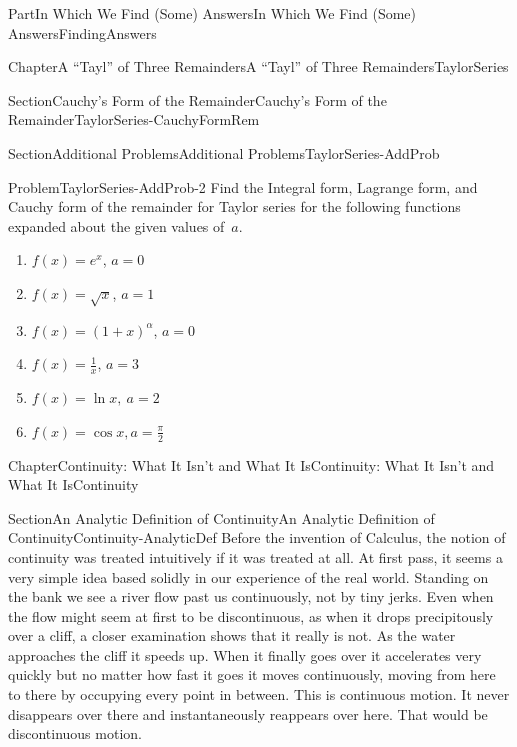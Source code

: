 \documentclass[oneside,10pt,]{book}
\numberwithin{equation}{part}
\begin{document}
\begin{partptx}{Part}{In Which We Find (Some) Answers}{}{In Which We Find (Some) Answers}{}{}{FindingAnswers}
\begin{chapterptx}{Chapter}{A ``Tayl'' of Three Remainders}{}{A ``Tayl'' of Three Remainders}{}{}{TaylorSeries}
\begin{sectionptx}{Section}{Cauchy's Form of the Remainder}{}{Cauchy's Form of the Remainder}{}{}{TaylorSeries-CauchyFormRem}
\end{sectionptx}
%
%
\typeout{************************************************}
\typeout{************************************************}
%
\begin{sectionptx}{Section}{Additional Problems}{}{Additional Problems}{}{}{TaylorSeries-AddProb}
\begin{problem}{Problem}{}{TaylorSeries-AddProb-2}%
Find the Integral form, Lagrange form, and Cauchy form of the remainder for Taylor series for the following functions expanded about the given values of \(\,a\).%
\begin{enumerate}[font=\bfseries,label=(\alph*),ref=\alph*]%
\item{}\(f(x)=e^x\), \(a=0\)%
\item{}\(f(x)=\sqrt{x}\), \(a=1\)%
\item{}\(f(x)=(1+x)^\alpha\), \(a=0\)%
\item{}\(f(x)=\frac{1}{x}\), \(a=3\)%
\item{}\(f(x)=\ln x,\ a=2\)%
\item{}\(f(x)=\cos x, a=\frac{\pi}{2}\)%
\end{enumerate}%
\end{problem}
\end{sectionptx}
\end{chapterptx}
%
%
\typeout{************************************************}
\typeout{************************************************}
%
\begin{chapterptx}{Chapter}{Continuity: What It Isn't and What It Is}{}{Continuity: What It Isn't and What It Is}{}{}{Continuity}
\renewcommand*{\chaptername}{Chapter}
%
%
\typeout{************************************************}
\typeout{************************************************}
%
\begin{sectionptx}{Section}{An Analytic Definition of Continuity}{}{An Analytic Definition of Continuity}{}{}{Continuity-AnalyticDef}
Before the invention of Calculus, the notion of continuity was treated intuitively if it was treated at all.  At first pass, it seems a very simple idea based solidly in our experience of the real world.  Standing on the bank we see a river flow past us continuously, not by tiny jerks.  Even when the flow might seem at first to be discontinuous, as when it drops precipitously over a cliff, a closer examination shows that it really is not. As the water approaches the cliff it speeds up.  When it finally goes over it accelerates very quickly but no matter how fast it goes it moves continuously, moving from here to there by occupying every point in between.  This is continuous motion. It never disappears over there and instantaneously reappears over here.  That would be discontinuous motion.%

\end{sectionptx}
\end{chapterptx}
\end{partptx}
\end{document}

